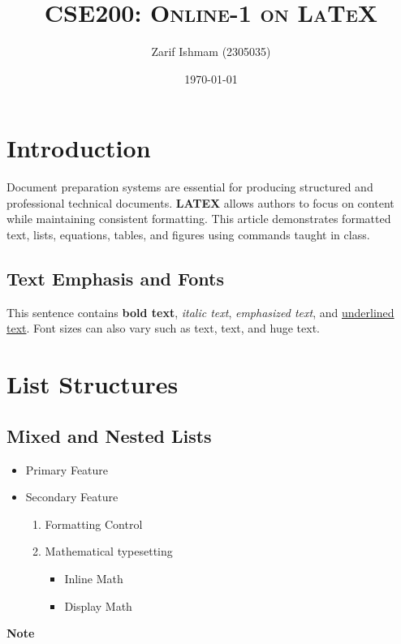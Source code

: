 \documentclass{article}
\title{\textsc{CSE200: Online-1 on \LaTeX}}
\author{Zarif Ishmam (2305035)}
\date{\today}
\begin{document}
\maketitle

\section{Introduction}
Document preparation systems are essential for producing structured and professional technical documents. \textbf{LATEX} allows authors to focus on content
while maintaining consistent formatting. This article demonstrates formatted
text, lists, equations, tables, and figures using commands taught in class.
\subsection{Text Emphasis and Fonts}
This sentence contains \textbf{bold text}, \textit{italic text}, \emph{emphasized text}, and \underline{underlined text}.
Font sizes can also vary such as {\LargeLarge text}, {\smallsmall text}, and 
{\huge huge text}.
\section{ List Structures}
\subsection{Mixed and Nested Lists}
\begin{itemize}
    \item Primary Feature
    \item Secondary Feature
        \begin{enumerate}
            \item Formatting Control
            \item Mathematical typesetting
                \begin{itemize}
                    \item[-] Inline Math
                    \item[-] Display Math
                \end{itemize}
        \end{enumerate}
\end{itemize}
\noindent \textbf{Note} 

\end{document}
